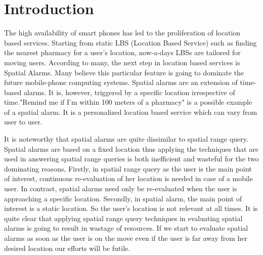 
\chapter{Introduction}
\label{chap:intro}

The high availability of smart phones has led to the proliferation of location based services. Starting from static LBS (Location Based Service) such as finding the nearest pharmacy for a user's location, now-a-days LBSs are tailored for moving users. According to many, the next step in location based services is Spatial Alarms. Many believe this particular feature is going to dominate the future mobile-phone computing systems. Spatial alarms are an extension of time-based alarms. It is, however, triggered by a specific location irrespective of time."Remind me if I'm within 100 meters of a pharmacy" is a possible example of a spatial alarm. It is a personalized location based service which can vary from user to user.

\vspace*{10pt}



It is noteworthy that spatial alarms are quite dissimilar to spatial range query. Spatial alarms are based on a fixed location thus applying the techniques that are used in answering spatial range queries is both inefficient and wasteful for the two dominating reasons, Firstly, in spatial range query as the user is the main point of interest, continuous re-evaluation of her location is needed in case of a mobile user. In contrast, spatial alarms need only be re-evaluated when the user is approaching a specific location. Secondly, in spatial alarm, the main point of interest is a static location. So the user's location is not relevant at all times. It is quite clear that applying spatial range query techniques in evaluating spatial alarms is going to result in wastage of resources. If we start to evaluate spatial alarms as soon as the user is on the move even if the user is far away from her desired location our efforts will be futile. 
\vspace*{10pt}




